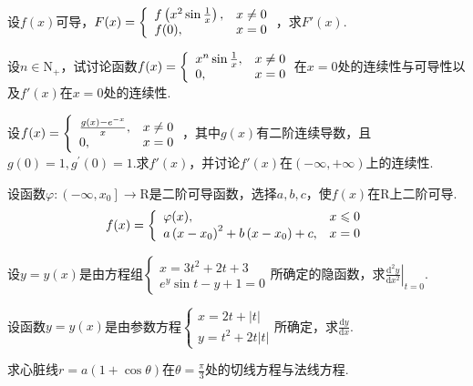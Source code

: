 \begin{xiti}
	\item 设$f(x)$可导，$F ( x ) = \left\{ \begin{array} { l l } { f \left( x ^ { 2 } \sin \frac { 1 } { x } \right) , } & { x \neq 0 } \\ { f ( 0 ) , } & { x = 0 } \end{array} \right.$，求$F'(x)$.
	\item 设$n \in \mathrm{ N } _ { + }$，试讨论函数$f ( x ) = \left\{ \begin{array} { l l } { x ^ { n } \sin \frac { 1 } { x } , } & { x \neq 0 } \\ { 0 , } & { x = 0 } \end{array} \right.$在$x=0$处的连续性与可导性以及$f'(x)$在$x=0$处的连续性.
	\item 设$f ( x ) = \left\{ \begin{array} { l l } { \frac { g ( x ) - e ^ { - x } } { x } , } & { x \neq 0 } \\ { 0 , } & { x = 0 } \end{array} \right.$，其中$g(x)$有二阶连续导数，且$g ( 0 ) = 1 ,  g ^ { \prime } ( 0 ) = 1$.求$f'(x)$，并讨论$f'(x)$在$(-\infty,+\infty)$上的连续性.
	\item 设函数$\varphi : \left( - \infty , x _ { 0 } \right] \rightarrow \mathrm { R }$是二阶可导函数，选择$a,b,c$，使$f(x)$在$\mathrm{ R }$上二阶可导.
	\[f ( x ) = \left\{ \begin{array} { l l } { \varphi ( x ) , } & { x \leqslant 0 } \\ { a \left( x - x _ { 0 } \right) ^ { 2 } + b \left( x - x _ { 0 } \right) + c , } & { x = 0 } \end{array} \right.\]
	\item 设$y=y(x)$是由方程组$\left\{ \begin{array} { l } { x = 3 t ^ { 2 } + 2 t + 3 } \\ { e ^ { y } \sin t - y + 1 = 0 } \end{array} \right.$所确定的隐函数，求$\left. \frac { \mathrm { d } ^ { 2 } y } { \mathrm { d } x ^ { 2 } } \right| _ { t = 0 }$.
	\item 设函数$y=y(x)$是由参数方程$\left\{ \begin{array} { l } { x = 2 t + | t | } \\ { y = t ^ { 2 } + 2 t | t | } \end{array} \right.$所确定，求$\frac { \mathrm { d } y } { \mathrm { d } x }$.
	\item 求心脏线$r = a ( 1 + \cos \theta )$在$\theta=\frac{\pi}{3}$处的切线方程与法线方程.

\end{xiti}
